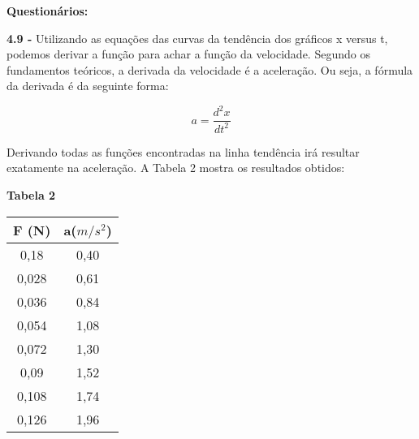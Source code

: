 \documentclass[article,12pt,oneside,a4paper,brazil]{abntex2}
\begin{document}
\begin{center}
\begin{figure}[h!]
			\label{fig:grafo-tabela1}
		\end{figure}
	\end{center}

	\begin{flushleft}
		\textbf{Questionários: }
		
		\textbf{4.9 -} Utilizando as equações das curvas da tendência dos gráficos x versus t, podemos derivar a função para achar a função da velocidade. Segundo os fundamentos teóricos, a derivada da velocidade é a aceleração. Ou seja, a fórmula da derivada é da seguinte forma:	
		
		\begin{equation*}
			a = \dfrac{d^2x}{dt^2}
		\end{equation*}
	
		Derivando todas as funções encontradas na linha tendência irá resultar exatamente na
		aceleração. A Tabela 2 mostra os resultados obtidos:
		
		\begin{center}
			\begin{table}[h!]
				\centering
				\begin{adjustwidth}{0cm}{0cm}
					\begin{flushleft}
						\textbf{Tabela 2}
					\end{flushleft}
				\end{adjustwidth}
				
				\label{tab:intervalos-forca}
				\begin{tabular}{|c|c|}
					\hline
					\textbf{F (N)} & a($m/s^2$)\\ \hline
					0,18 & 0,40 \\ \hline
					0,028 & 0,61 \\ \hline
					0,036 & 0,84 \\ \hline
					0,054 & 1,08 \\ \hline
					0,072 & 1,30 \\ \hline
					0,09 & 1,52 \\ \hline
					0,108 & 1,74 \\ \hline
					0,126 & 1,96 \\ \hline
				\end{tabular}
				

\end{table}
\end{center}
\end{flushleft}
\end{document}
